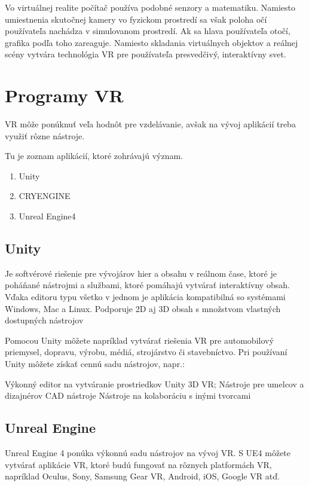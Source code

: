 \documentclass[10pt,twoside,slovak,a4paper]{article}
\begin{document}
Vo virtuálnej realite počítač používa podobné senzory a matematiku. Namiesto umiestnenia skutočnej kamery vo fyzickom prostredí sa však poloha očí používateľa nachádza v simulovanom prostredí. Ak sa hlava používateľa otočí, grafika podľa toho zareaguje. Namiesto skladania virtuálnych objektov a reálnej scény vytvára technológia VR pre používateľa presvedčivý, interaktívny svet.

\cite{hayes_2021}\vspace{20mm}

\section{Programy VR} \label{ina}
VR môže ponúknuť veľa hodnôt pre vzdelávanie, avšak na vývoj aplikácií treba využiť rôzne nástroje. 

Tu je zoznam aplikácií, ktoré zohrávajú význam.
\begin{enumerate}
\item Unity
\item CRYENGINE
\item Unreal Engine4
\end{enumerate} 

\subsection {Unity}

Je softvérové riešenie pre vývojárov hier a obsahu v reálnom čase, ktoré je poháňané nástrojmi a službami, ktoré pomáhajú vytvárať interaktívny obsah.
Vďaka editoru typu všetko v jednom je aplikácia kompatibilná so systémami Windows, Mac a Linux.
Podporuje 2D aj 3D obsah s množstvom vlastných dostupných nástrojov

Pomocou Unity môžete napríklad vytvárať riešenia VR pre automobilový priemysel, dopravu, výrobu, médiá, strojárstvo či stavebníctvo.
Pri používaní Unity môžete získať cennú sadu nástrojov, napr.:

Výkonný editor na vytváranie prostriedkov Unity 3D VR;
Nástroje pre umelcov a dizajnérov
CAD nástroje
Nástroje na kolaboráciu s inými tvorcami
\cite{devteam_2021}

\subsection {Unreal Engine}
Unreal Engine 4  ponúka výkonnú sadu nástrojov na vývoj VR. S UE4 môžete vytvárať aplikácie VR, ktoré budú fungovať na rôznych platformách VR, napríklad Oculus, Sony, Samsung Gear VR, Android, iOS, Google VR atď.
\end{document}
